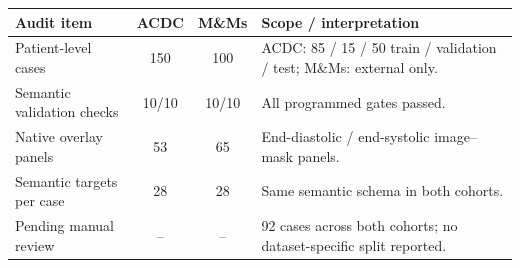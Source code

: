 \label{tab:cohort_qc_evidence}
\begin{tabularx}{\linewidth}{@{}p{53mm}ccY@{}}
\toprule
\textbf{Audit item} & \textbf{ACDC} & \textbf{M\&Ms} & \textbf{Scope / interpretation}\\
\midrule
Patient-level cases & 150 & 100 & ACDC: 85 / 15 / 50 train / validation / test; M\&Ms: external only.\\
Semantic validation checks & 10/10 & 10/10 & All programmed gates passed.\\
Native overlay panels & 53 & 65 & End-diastolic / end-systolic image--mask panels.\\
Semantic targets per case & 28 & 28 & Same semantic schema in both cohorts.\\
Pending manual review & -- & -- & 92 cases across both cohorts; no dataset-specific split reported.\\
\bottomrule
\end{tabularx}
